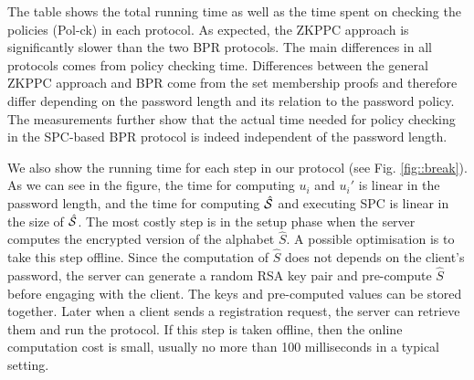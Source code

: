 The table shows the total running time as well as the time spent on checking the policies (Pol-ck) in each protocol. 
As expected, the \ac{ZKPPC} approach is significantly slower than the two \ac{BPR} protocols.
The main differences in all protocols comes from policy checking time.
Differences between the general \ac{ZKPPC} approach and \ac{BPR} come from the set membership proofs and therefore differ depending on the password length and its relation to the password policy. 
The measurements further show that the actual time needed for policy checking in the \ac{SPC}-based \ac{BPR} protocol is indeed independent of the password length.



We also show the running time for each step in our protocol (see Fig. \ref{fig::break}). As we can see in the figure, the time for computing $u_i$ and $u_i'$ is linear in the password length, and the time for computing $\hat{\mathcal{S}}$ and executing \ac{SPC} is linear in the size of $\hat{\mathcal{S}}$. The most costly step is in the setup phase when the server computes the encrypted version of the alphabet $\hat{S}$. A possible optimisation is to take this step offline. 
Since the computation of $\hat{S}$ does not depends on the client's password, the server can generate a random RSA key pair and pre-compute $\hat{S}$ before engaging with the client. 
The keys and pre-computed values can be stored together. Later when a client sends a registration request, the server can retrieve them and run the protocol. If this step is taken offline, then the online computation cost is small, usually no more than 100 milliseconds in a typical setting. 
